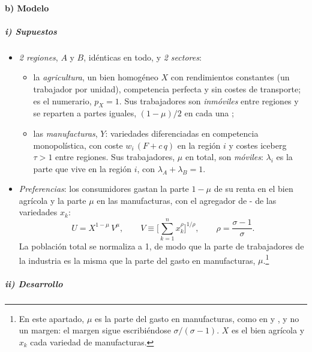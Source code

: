 \documentclass[11pt]{article}
\begin{document}
\paragraph{b) Modelo}

\subparagraph{i) Supuestos}

\begin{itemize}
\item \emph{2 regiones}, $A$ y $B$, idénticas en todo, y \emph{2 sectores}:
  \begin{itemize}
  \item la \emph{agricultura}, un bien homogéneo $X$ con rendimientos constantes (un trabajador por unidad), competencia perfecta y sin costes de transporte; es el numerario, $p_X=1$. Sus trabajadores son \emph{inmóviles} entre regiones y se reparten a partes iguales, $(1-\mu)/2$ en cada una ;
  \item las \emph{manufacturas}, $Y$: variedades diferenciadas en competencia monopolística, con coste $w_i\,(F+c\,q)$ en la región $i$ y costes iceberg $\tau>1$ entre regiones. Sus trabajadores, $\mu$ en total, son \emph{móviles}: $\lambda_i$ es la parte que vive en la región $i$, con $\lambda_A+\lambda_B=1$.
  \end{itemize}
\item \emph{Preferencias}: los consumidores gastan la parte $1-\mu$ de su renta en el bien agrícola y la parte $\mu$ en las manufacturas, con el agregador de -  de las variedades $x_k$:
  $$U=X^{1-\mu}\,V^{\mu},\qquad V\equiv\Big[\sum_{k=1}^{n}x_k^{\rho}\Big]^{1/\rho},\qquad \rho=\frac{\sigma-1}{\sigma}.$$
  La población total se normaliza a 1, de modo que la parte de trabajadores de la industria es la misma que la parte del gasto en manufacturas, $\mu$.\footnote{En este apartado, $\mu$ es la parte del gasto en manufacturas, como en \textcite{Krugman1991Increasing} y \textcite{FujitaKrugmanVenables1999Spatial}, y no un margen: el margen sigue escribiéndose $\sigma/(\sigma-1)$. $X$ es el bien agrícola y $x_k$ cada variedad de manufacturas.}
\end{itemize}

\subparagraph{ii) Desarrollo}
\end{document}
